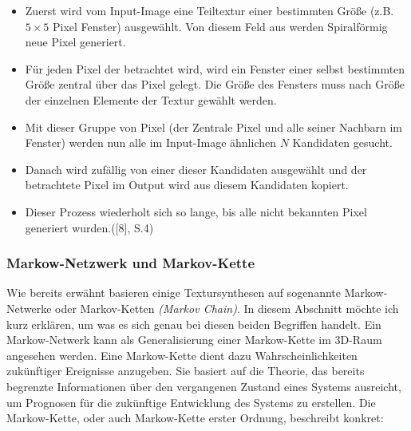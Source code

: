\documentclass[12pt]{report}
\begin{document}
\begin{itemize}
    \item Zuerst wird vom Input-Image eine Teiltextur einer bestimmten Größe {(z.B. $5\times 5$ Pixel Fenster)} ausgewählt. Von diesem Feld aus werden Spiralförmig neue Pixel generiert.
    \item Für jeden Pixel der betrachtet wird, wird ein Fenster einer selbst bestimmten Größe zentral über das Pixel gelegt.
    Die Größe des Fensters muss nach Größe der einzelnen Elemente der Textur gewählt werden.
    \item Mit dieser Gruppe von Pixel {(der Zentrale Pixel und alle seiner Nachbarn im Fenster)} werden nun alle im Input-Image ähnlichen $N$ Kandidaten gesucht.
    \item Danach wird zufällig von einer dieser Kandidaten ausgewählt und der betrachtete Pixel im Output wird aus diesem Kandidaten kopiert.
    \item Dieser Prozess wiederholt sich so lange, bis alle nicht bekannten Pixel generiert wurden.{([8], S.4)}
\end{itemize}

\subsubsection{Markow-Netzwerk und Markov-Kette}

Wie bereits erwähnt basieren einige Textursynthesen auf sogenannte Markow-Netwerke oder Markov-Ketten \textit{(Markov Chain)}.
In diesem Abschnitt möchte ich kurz erklären, um was es sich genau bei diesen beiden Begriffen handelt.
Ein Markow-Netwerk kann als Generalisierung einer Markow-Kette im 3D-Raum angesehen werden.
Eine Markow-Kette dient dazu Wahrscheinlichkeiten zukünftiger Ereignisse anzugeben.
Sie basiert auf die Theorie, das bereits begrenzte Informationen über den vergangenen Zustand eines Systems ausreicht,
um Prognosen für die zukünftige Entwicklung des Systems zu erstellen.
Die Markow-Kette, oder auch Markow-Kette erster Ordnung, beschreibt konkret:
\end{document}
